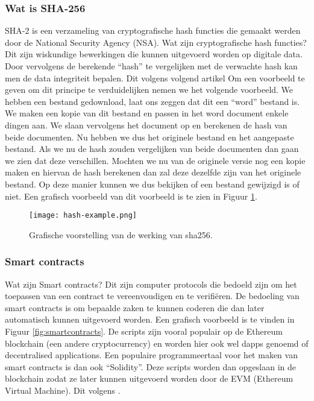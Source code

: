 \subsubsection{Wat is SHA-256}
SHA-2 is een verzameling van cryptografische hash functies die gemaakt werden door de National Security Agency (NSA). Wat zijn cryptografische hash functies? Dit zijn wiskundige bewerkingen die kunnen uitgevoerd worden op digitale data. Door vervolgens de berekende ``hash'' te vergelijken met de verwachte hash kan men de data integriteit bepalen. Dit volgens volgend artikel \textcite{Wikipedia-Sha} Om een voorbeeld te geven om dit principe te verduidelijken nemen we het volgende voorbeeld. We hebben een bestand gedownload, laat ons zeggen dat dit een ``word'' bestand is. We maken een kopie van dit bestand en passen in het word document enkele dingen aan. We slaan vervolgens het document op en berekenen de hash van beide documenten. Nu hebben we dus het originele bestand en het aangepaste bestand. Als we nu de hash zouden vergelijken van beide documenten dan gaan we zien dat deze verschillen. Mochten we nu van de originele versie nog een kopie maken en hiervan de hash berekenen dan zal deze dezelfde zijn van het originele bestand. Op deze manier kunnen we dus bekijken of een bestand gewijzigd is of niet. Een grafisch voorbeeld van dit voorbeeld is te zien in Figuur \ref{fig:hash-example}.

 \begin{figure}
 	\texttt{[image: hash-example.png]}
 	\caption{Grafische voorstelling van de werking van sha256.}
 	\label{fig:hash-example}
 \end{figure}

\subsubsection{Smart contracts}
Wat zijn Smart contracts? Dit zijn computer protocols die bedoeld zijn om het toepassen van een contract te vereenvoudigen en te verifiëren. De bedoeling van smart contracts is om bepaalde zaken te kunnen coderen die dan later automatisch kunnen uitgevoerd worden. Een grafisch voorbeeld is te vinden in Figuur \ref{fig:smartcontracts}. De scripts zijn vooral populair op de Ethereum blockchain (een andere cryptocurrency) en worden hier ook wel dapps genoemd of decentralised applications. Een populaire programmeertaal voor het maken van smart contracts is dan ook ``Solidity''. Deze scripts worden dan opgeslaan in de blockchain zodat ze later kunnen uitgevoerd worden door de EVM (Ethereum Virtual Machine). Dit volgens \textcite{Chandrayan2017}.

